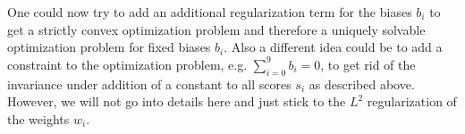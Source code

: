 One could now try to add an additional regularization term for the biases $b_i$ to get a strictly convex optimization problem and therefore a uniquely solvable optimization problem for fixed biases $b_i$. Also a different idea could be to add a constraint to the optimization problem, e.g. $\sum_{i=0}^9 b_i = 0$, to get rid of the invariance under addition of a constant to all scores $s_i$ as described above. However, we will not go into details here and just stick to the $L^2$ regularization of the weights $w_i$.
